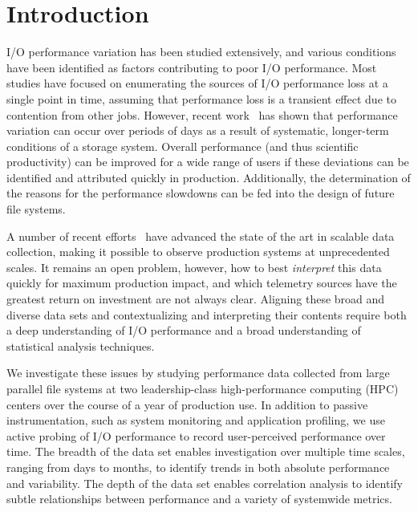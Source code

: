\section{Introduction}

I/O performance variation has been studied extensively, and various conditions have been identified as  factors contributing to poor I/O performance.  Most studies have focused on enumerating the sources of I/O performance loss at a single point in time, assuming that performance loss is a transient effect due to contention from other jobs.  However, recent work~\cite{Lockwood2017} has shown that performance variation can occur over periods of days as a result of systematic, longer-term conditions of a storage system.
%
Overall performance (and thus scientific productivity) can be improved for a
wide range of users if these deviations can be identified and attributed
quickly in production. Additionally, the determination of the reasons for the performance slowdowns can be fed into the design of future file systems. 


A number of recent efforts~\cite{Lockwood2017,Vazhkudai2017guide,Agelastos2014ldms,Kunkel2014siox} have advanced the
state of the art in scalable data collection, making it possible to observe
production systems at unprecedented scales.  It remains an open problem,
however, how to best \emph{interpret} this data quickly for maximum production
impact, and which telemetry sources have the greatest return on
investment are not always clear.
Aligning these broad and diverse data sets and contextualizing and interpreting their contents require both a deep understanding of I/O performance and a broad understanding of statistical analysis techniques.

We investigate these issues by studying performance data collected
from large parallel file systems at two leadership-class high-performance computing (HPC) centers
over the course of a year of production use.  In addition to passive
instrumentation, such as system monitoring and application profiling,
we use active probing of I/O performance to record user-perceived
performance over time.  The breadth of the data set enables investigation
over multiple time scales, ranging from days to months, to identify trends in
both absolute performance and variability.  The depth of the data set
enables correlation analysis to identify subtle relationships between
performance and a variety of systemwide metrics.

